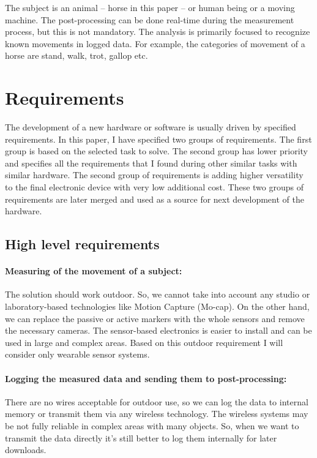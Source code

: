 The subject is an animal -- horse in this paper -- or human being or a moving machine. The post-processing can be done real-time during the measurement process, but this is not mandatory. The analysis is primarily focused to recognize known movements in logged data. For example, the categories of movement of a horse are stand, walk, trot, gallop etc.

\section{Requirements}
\label{HWrequirements}
The development of a new hardware or software is usually driven by specified requirements. In this paper, I have specified two groups of requirements. The first group is based on the selected task to solve. The second group has lower priority and specifies all the requirements that I found during other similar tasks with similar hardware. The second group of requirements is adding higher versatility to the final electronic device with very low additional cost. These two groups of requirements are later merged and used as a source for next development of the hardware.

\subsection{High level requirements}

\paragraph{Measuring of the movement of a subject:} The solution should work outdoor. So, we cannot take into account any studio or laboratory-based technologies like Motion Capture (Mo-cap). On the other hand, we can replace the passive or active markers with the whole sensors and remove the necessary cameras. The sensor-based electronics is easier to install and can be used in large and complex areas. Based on this outdoor requirement I will consider only wearable sensor systems.

\paragraph{Logging the measured data and sending them to post-processing:} There are no wires acceptable for outdoor use, so we can log the data to internal memory or transmit them via any wireless technology. The wireless systems may be not fully reliable in complex areas with many objects. So, when we want to transmit the data directly it's still better to log them internally for later downloads.

